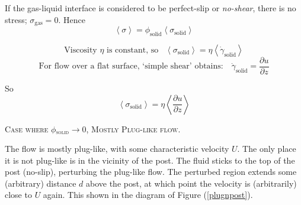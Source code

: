 \documentclass[12pt, a4paper, twoside, openright]{book}
\newcommand{\phisol}{\ensuremath{\phi_{\mathrm{solid}}}}
\newcommand{\sigsol}{\ensuremath{\sigma_{\mathrm{solid}}}}
\begin{document}
If the gas-liquid interface is considered to be perfect-slip or \emph{no-shear}, there is no stress; $ \sigma_{\mathrm{gas}} = 0 $.  Hence 
\begin{equation}
\left< \sigma \right> = \phisol \left<  \sigsol \right>
\end{equation}

\begin{equation}
\text{Viscosity $\eta$ is constant, so} \;\;\;
\left< \sigsol \right> = \eta \left< \dot{\gamma}_{\mathrm{solid}} \right>
\end{equation}
\begin{equation}
\text{For flow over a flat surface, `simple shear' obtains:} \quad
\dot{\gamma}_{\mathrm{solid}} = \frac{\partial u}{\partial z}
\end{equation}

So
\begin{equation}
\left< \sigsol \right> = \eta \left< \frac{\partial u}{\partial z} \right>
\end{equation}

\vspace{1em}
\colorbox[gray]{0.8}{ \textsc{Case where $\phisol \rightarrow 0$, Mostly Plug-like flow.} }
\vspace{0.5em}

The flow is mostly plug-like, with some characteristic velocity $U$.  The only place it is not plug-like is in the vicinity of the post.  The fluid sticks to the top of the post (no-slip), perturbing the plug-like flow.  The perturbed region extends some (arbitrary) distance $d$ above the post, at which point the velocity is (arbitrarily) close to $U$ again.  This shown in the diagram of Figure (\ref{plugnpost}).

\clearpage
\end{document}
